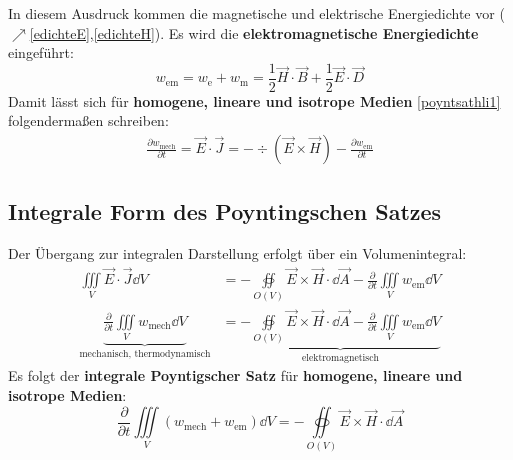 		   In diesem Ausdruck kommen die magnetische und elektrische Energiedichte vor ($\nearrow$\ref{edichteE},\ref{edichteH}). Es wird die \textbf{elektromagnetische Energiedichte} eingeführt:
		   \begin{equation}
		   	\boxed{w_\text{em}=w_\text{e}+w_\text{m}=\frac{1}{2} \vec{H} \cdot\vec{B}  + \frac{1}{2} \vec{E} \cdot \vec{D}}
		   \end{equation}
		   Damit lässt sich für \textbf{homogene, lineare und isotrope Medien} \ref{poyntsathli1} folgendermaßen schreiben:
		        \begin{equation}\label{poyntsathli}\begin{split}
				     \boxed{ \frac{\partial w_\text{mech}}{\partial t}=\vec{E} \cdot \vec{J}= - \div \left(\vec{E} \times \vec{H} \right) - \frac{\partial w_\text{em}}{\partial t}}
			        \end{split}\end{equation}
		   \subsection{Integrale Form des Poyntingschen Satzes}
		   Der Übergang zur integralen Darstellung erfolgt über ein Volumenintegral:
		        \begin{align*}
			         \iiint\limits_V \vec{E} \cdot \vec{J} \dd V & = - \oiint\limits_{O(V)} \vec{E} \times \vec{H}  \cdot \dd\vec{A} - \frac{\partial}{\partial t} \iiint\limits_V w_\text{em} \dd V \\
			         \underbrace{\frac{\partial}{\partial t} \iiint\limits_V w_\text{mech} \dd V }_{\text{mechanisch, thermodynamisch}}                                                       & = \underbrace{- \oiint\limits_{O(V)} \vec{E} \times \vec{H}  \cdot \dd\vec{A} - \frac{\partial}{\partial t} \iiint\limits_V w_\text{em} \dd V         }_\text{elektromagnetisch}                 
			    \end{align*}
			   Es folgt der \textbf{integrale Poyntigscher Satz} für \textbf{homogene, lineare und isotrope Medien}:
			    \begin{equation}\label{poyntint}
			        \boxed{\frac{\partial}{\partial t} \iiint\limits_V \left( w_\text{mech} + w_\text{em} \right) \dd V                                  = - \oiint\limits_{O(V)} \vec{E} \times \vec{H}  \cdot \dd\vec{A}}
		        \end{equation}
